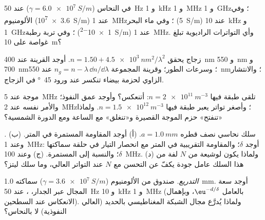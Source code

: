 \begin{exercise}[$\star$]\label{exo:b2:waves-in-media:2}
 في النحاس ($\gamma = \qty{6.0e7}{S/m}$) عند \qty{50}{Hz} و \qty{1}{kHz}
و \qty{1}{MHz} و \qty{1}{GHz}؛ وفي الألومنيوم (\qty{3.6e7}{S/m}) عند \qty{1}{MHz}؛ وفي ماء
البحر (\qty{5}{S/m}) عند \qty{10}{kHz} و \qty{1}{GHz}؛ وفي تربة رطبة (\qty{1e-2}{S/m})
عند \qty{1}{MHz}. وأي التواترات الراديوية تبلغ غواصة على \qty{10}{m}؟
\end{exercise}

\begin{exercise}[$\star$]\label{exo:b2:waves-in-media:3}
زجاج يحقق $n = 1.50 + \qty{4.5e3}{nm^2}/\lambda^2$. أوجد القرينة عند \qty{400}{nm}
و \qty{550}{nm} و \qty{700}{nm}؛ وسرعات الطور؛ وقرينة المجموعة $n_g = n -
\lambda\,\dd n/\dd\lambda$ عند \qty{550}{nm}؛ والانتشار الزاوي لحزمة بيضاء
تنكسر عند ورود \qty{45}{\degree} في الزجاج.
\end{exercise}

\begin{exercise}[$\star$]\label{exo:b2:waves-in-media:4}
موجة عند \qty{5}{MHz} تلقى طبقة فيها $n = \qty{2e11}{m^{-3}}$: أتنعكس؟
وأوجد عمق النفوذ؛ والأمر نفسه عند \qty{2}{MHz}؛ وأصغر تواتر
يعبر طبقة فيها $n = \qty{1.5e12}{m^{-3}}$. ولماذا «تنفتح» حزم الموجة القصيرة
و«تنغلق» مع الساعة ومع الدورة الشمسية؟
\end{exercise}

\begin{exercise}[$\star\star$]\label{exo:b2:waves-in-media:5}
\emph{.} سلك نحاسي نصف قطره $a = \qty{1.0}{mm}$. (أ) أوجد المقاومة
المستمرة في المتر. (ب) وعند \qty{1}{MHz}: أوجد $\delta$؛ والمقاومة التقريبية
في المتر مع انحصار التيار في حلقة سماكتها $\delta$؛
والنسبة إلى المستمرة. (ج) وعند \qty{100}{MHz}. (د) ولماذا يكون لوشيعة من $N$ لفة من
هذا السلك عامل جودة يكفّ عن التحسن مع $N$ عند التواتر
العالي، وما سلك ليتز؟
\end{exercise}

\begin{exercise}[$\star\star$]\label{exo:b2:waves-in-media:6}
\emph{التدريع.} صندوق من الألومنيوم ($\gamma = \qty{3.6e7}{S/m}$) سماكته \qty{1.0}{mm}.
أوجد  سعة المجال عبر الجدار، ، عند
\qty{50}{Hz} و \qty{10}{kHz} و \qty{1}{MHz} (بالعامل $\eu^{-d/\delta}$، وبإهمال الانعكاس عند
السطحين). ولماذا يُدرَّع مجال الشبكة المغناطيسي
بالحديد (العالي النفوذية) لا بالنحاس؟
\end{exercise}

